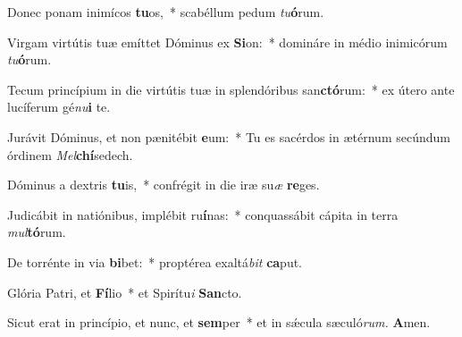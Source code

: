 \item Donec ponam inimícos \textbf{tu}os,~* scabéllum pedum \textit{tu}\textbf{ó}rum.
\item Virgam virtútis tuæ emíttet Dóminus ex \textbf{Si}on:~* domináre in médio inimicórum \textit{tu}\textbf{ó}rum.
\item Tecum princípium in die virtútis tuæ in splendóribus san\textbf{ctó}rum:~* ex útero ante lucíferum gé\hspace{0.03em}\textit{nu}\textbf{i} te.
\item Jurávit Dóminus, et non pænitébit \textbf{e}um:~* Tu es sacérdos in ætérnum secúndum órdinem \textit{Mel}\textbf{chí}sedech.
\item Dóminus a dextris \textbf{tu}is,~* confrégit in die iræ su\hspace{0.03em}\textit{æ} \textbf{re}ges.
\item Judicábit in natiónibus, implébit ru\textbf{í}nas:~* conquassábit cápita in terra \textit{mul}\textbf{tó}rum.
\item De torrénte in via \textbf{bi}bet:~* proptérea exaltá\hspace{0.03em}\textit{bit} \textbf{ca}put.
\item Glória Patri, et \textbf{Fí}lio~* et Spirítu\textit{i} \textbf{San}cto.
\item Sicut erat in princípio, et nunc, et \textbf{sem}per~* et in sǽcula sæculó\textit{rum.} \textbf{A}men.